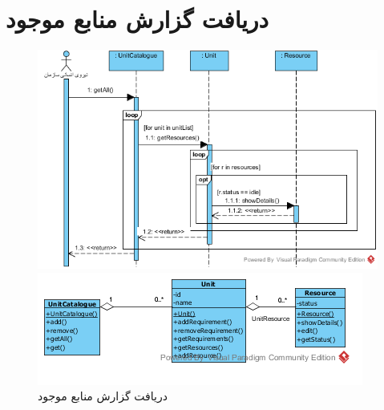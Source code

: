 \section{دریافت گزارش منابع موجود}
\begin{figure}[H]
	\centering
	\includegraphics[scale=1]{img/sequence-analysis/AvailableResourcesReport}
	
	
	\includegraphics[scale=1]{img/sequence-analysis/AvailableResourcesReportC}
	\caption{دریافت گزارش منابع موجود}
\end{figure}


